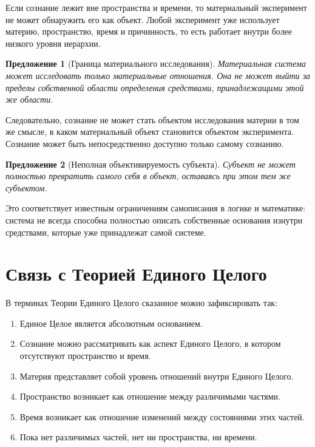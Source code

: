 \documentclass[12pt,a4paper,oneside]{book}
\theoremstyle{definition}
\theoremstyle{plain}
\newtheorem{proposition}{Предложение}[chapter]
\theoremstyle{remark}
\begin{document}
Если сознание лежит вне пространства и времени, то материальный эксперимент не
может обнаружить его как объект. Любой эксперимент уже использует материю,
пространство, время и причинность, то есть работает внутри более низкого уровня
иерархии.

\begin{proposition}[Граница материального исследования]
Материальная система может исследовать только материальные отношения. Она не может
выйти за пределы собственной области определения средствами, принадлежащими этой
же области.
\end{proposition}

Следовательно, сознание не может стать объектом исследования материи в том же
смысле, в каком материальный объект становится объектом эксперимента. Сознание
может быть непосредственно доступно только самому сознанию.

\begin{proposition}[Неполная объективируемость субъекта]
Субъект не может полностью превратить самого себя в объект, оставаясь при этом
тем же субъектом.
\end{proposition}

Это соответствует известным ограничениям самописания в логике и математике: система
не всегда способна полностью описать собственные основания изнутри средствами,
которые уже принадлежат самой системе.

\section{Связь с Теорией Единого Целого}

В терминах Теории Единого Целого сказанное можно зафиксировать так:

\begin{enumerate}
    \item Единое Целое является абсолютным основанием.
    \item Сознание можно рассматривать как аспект Единого Целого, в котором
    отсутствуют пространство и время.
    \item Материя представляет собой уровень отношений внутри Единого Целого.
    \item Пространство возникает как отношение между различимыми частями.
    \item Время возникает как отношение изменений между состояниями этих частей.
    \item Пока нет различимых частей, нет ни пространства, ни времени.
\end{enumerate}
\end{document}
